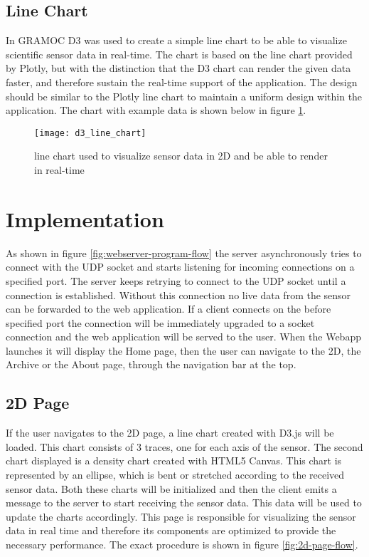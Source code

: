 \subsection{Line Chart}
In GRAMOC D3 was used to create a simple line chart to be able to visualize scientific sensor data in real-time. The chart is based on the line chart provided by Plotly, but with the distinction that the D3 chart can render the given data faster, and therefore sustain the real-time support of the application. The design should be similar to the Plotly line chart to maintain a uniform design within the application. The chart with example data is shown below in figure \ref{fig:d3linechart}.

\begin{figure}[H]
    \centering
    \texttt{[image: d3\_line\_chart]}
    \caption{line chart used to visualize sensor data in 2D and be able to render in real-time}
    \label{fig:d3linechart}
\end{figure}


\section{Implementation}
As shown in figure \ref{fig:webserver-program-flow} the server asynchronously tries to connect with the UDP socket and starts listening for incoming connections on a specified port. The server keeps retrying to connect to the UDP socket until a connection is established. Without this connection no live data from the sensor can be forwarded to the web application. If a client connects on the before specified port the connection will be immediately upgraded to a socket connection and the web application will be served to the user. When the Webapp launches it will display the Home page, then the user can navigate to the 2D, the Archive or the About page, through the navigation bar at the top.

\subsection{2D Page}
If the user navigates to the 2D page, a line chart created with D3.js will be loaded. This chart consists of 3 traces, one for each axis of the sensor. The second chart displayed is a density chart created with HTML5 Canvas. This chart is represented by an ellipse, which is bent or stretched according to the received sensor data. Both these charts will be initialized and then the client emits a message to the server to start receiving the sensor data. This data will be used to update the charts accordingly. This page is responsible for visualizing the sensor data in real time and therefore its components are optimized to provide the necessary performance. The exact procedure is shown in figure \ref{fig:2d-page-flow}.

